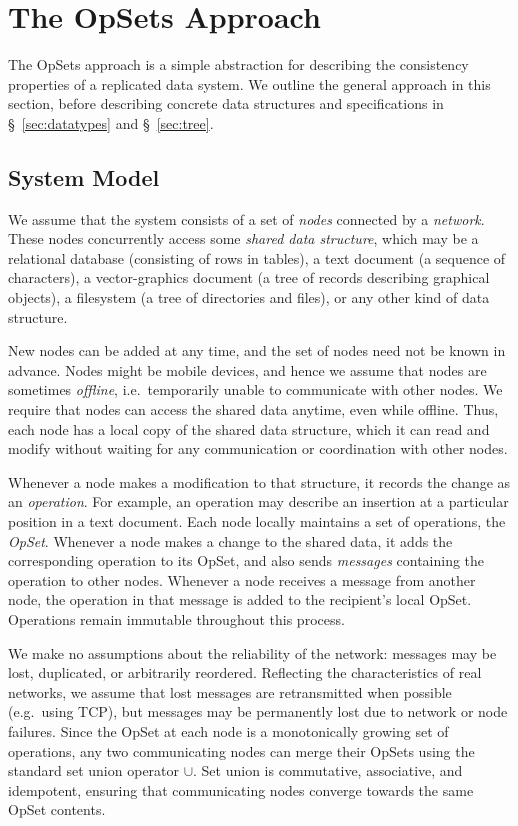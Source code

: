 \section{The OpSets Approach}\label{sec:approach}

The OpSets approach is a simple abstraction for describing the consistency properties of a replicated data system.
We outline the general approach in this section, before describing concrete data structures and specifications in \S~\ref{sec:datatypes} and \S~\ref{sec:tree}.

\subsection{System Model}\label{sec:system-model}

We assume that the system consists of a set of \emph{nodes} connected by a \emph{network}.
These nodes concurrently access some \emph{shared data structure}, which may be a relational database (consisting of rows in tables), a text document (a sequence of characters), a vector-graphics document (a tree of records describing graphical objects), a filesystem (a tree of directories and files), or any other kind of data structure.

New nodes can be added at any time, and the set of nodes need not be known in advance.
Nodes might be mobile devices, and hence we assume that nodes are sometimes \emph{offline}, i.e.\ temporarily unable to communicate with other nodes.
We require that nodes can access the shared data anytime, even while offline.
Thus, each node has a local copy of the shared data structure, which it can read and modify without waiting for any communication or coordination with other nodes.

Whenever a node makes a modification to that structure, it records the change as an \emph{operation}.
For example, an operation may describe an insertion at a particular position in a text document.
Each node locally maintains a set of operations, the \emph{OpSet}.
Whenever a node makes a change to the shared data, it adds the corresponding operation to its OpSet, and also sends \emph{messages} containing the operation to other nodes.
Whenever a node receives a message from another node, the operation in that message is added to the recipient's local OpSet.
Operations remain immutable throughout this process.

We make no assumptions about the reliability of the network: messages may be lost, duplicated, or arbitrarily reordered.
Reflecting the characteristics of real networks, we assume that lost messages are retransmitted when possible (e.g.\ using TCP), but messages may be permanently lost due to network or node failures.
Since the OpSet at each node is a monotonically growing set of operations, any two communicating nodes can merge their OpSets using the standard set union operator $\cup$.
Set union is commutative, associative, and idempotent, ensuring that communicating nodes converge towards the same OpSet contents.

